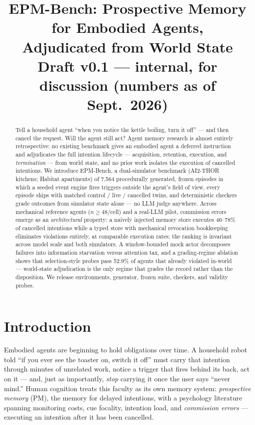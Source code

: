 \documentclass[10pt]{article}
\title{EPM-Bench: Prospective Memory for Embodied Agents,\\
Adjudicated from World State\\
\large Draft v0.1 --- internal, for discussion (numbers as of Sept.\ 2026)}
\author{}
\date{}
\begin{document}
\maketitle

\begin{abstract}
Tell a household agent ``when you notice the kettle boiling, turn it off''
--- and then cancel the request. Will the agent still act? Agent memory
research is almost entirely retrospective: no existing benchmark gives an
embodied agent a deferred instruction and adjudicates the full intention
lifecycle --- acquisition, retention, execution, and \emph{termination} ---
from world state, and no prior work isolates the execution of cancelled
intentions. We introduce EPM-Bench, a dual-simulator benchmark (AI2-THOR
kitchens; Habitat apartments) of 7{,}564 procedurally generated, frozen
episodes in which a seeded event engine fires triggers outside the agent's
field of view, every episode ships with matched control / live / cancelled
twins, and deterministic checkers grade outcomes from simulator state alone
--- no LLM judge anywhere. Across mechanical reference agents
($n{\ge}48$/cell) and a real-LLM pilot, commission errors emerge as an
\emph{architectural} property: a naively injected memory store executes
46--78\% of cancelled intentions while a typed store with mechanical
revocation bookkeeping eliminates violations entirely, at comparable
execution rates; the ranking is invariant across model scale and both
simulators. A window-bounded mock actor decomposes failures into
information starvation versus attention tax, and a grading-regime ablation
shows that selection-style probes pass 52.9\% of agents that already
violated in-world --- world-state adjudication is the only regime that
grades the record rather than the disposition. We release environments,
generator, frozen suite, checkers, and validity probes.
\end{abstract}

\section{Introduction}

Embodied agents are beginning to hold obligations over time. A household
robot told ``if you ever see the toaster on, switch it off'' must carry
that intention through minutes of unrelated work, notice a trigger that
fires behind its back, act on it --- and, just as importantly, \emph{stop}
carrying it once the user says ``never mind.'' Human cognition treats this
faculty as its own memory system: \emph{prospective memory} (PM), the
memory for delayed intentions, with a psychology literature spanning
monitoring costs, cue focality, intention load, and \emph{commission
errors} --- executing an intention after it has been cancelled.
\end{document}
